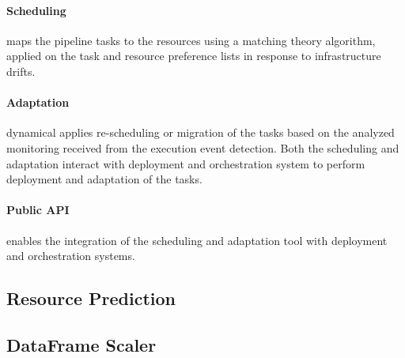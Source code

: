         \paragraph{Scheduling } maps the pipeline tasks to the resources using a matching theory algorithm, applied on the task and resource preference lists in response to infrastructure drifts.

        \paragraph{Adaptation } dynamical applies re-scheduling or migration of the tasks based on the analyzed monitoring received from the execution event detection. Both the scheduling and adaptation interact with deployment and orchestration system to perform deployment and adaptation of the tasks.

        \paragraph{Public API } enables the integration of the \SAA{} scheduling and adaptation tool with deployment and orchestration systems. \cite{kimovskiBigDataPipeline2022}
  \subsection{Resource Prediction}
  \subsection{DataFrame Scaler}
  \label{sec:dataframe-scaler-architecture-and-implementation}

